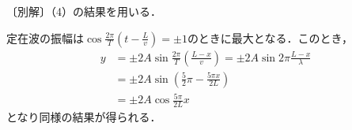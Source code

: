\noindent
〔別解〕（4）の結果を用いる．\par 
定在波の振幅は$\cos \frac{2\pi}{T}\left(t-\frac{L}{v}\right)=\pm 1$のときに最大となる．このとき，
\begin{align*}
  y &= \pm 2A\sin \frac{2\pi}{T}\left(\frac{L-x}{v}\right) 
  = \pm 2A\sin 2\pi \frac{L-x}{\lambda} \\
  &= \pm 2A\sin \left(\frac{5}{2}\pi - \frac{5\pi x}{2L}\right) \\
  &= \pm 2A\cos\frac{5\pi}{2L}x
\end{align*}
\noindent
となり同様の結果が得られる．




